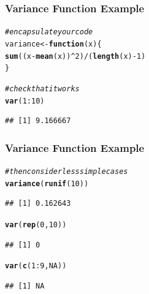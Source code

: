 \documentclass[12pt]{beamer}\usepackage[]{graphicx}\usepackage[]{color}
\makeatletter
\newcommand{\hlnum}[1]{\textcolor[rgb]{0.686,0.059,0.569}{#1}}%
\newcommand{\hlcom}[1]{\textcolor[rgb]{0.678,0.584,0.686}{\textit{#1}}}%
\newcommand{\hlopt}[1]{\textcolor[rgb]{0,0,0}{#1}}%
\newcommand{\hlstd}[1]{\textcolor[rgb]{0.345,0.345,0.345}{#1}}%
\newcommand{\hlkwa}[1]{\textcolor[rgb]{0.161,0.373,0.58}{\textbf{#1}}}%
\newcommand{\hlkwb}[1]{\textcolor[rgb]{0.69,0.353,0.396}{#1}}%
\newcommand{\hlkwc}[1]{\textcolor[rgb]{0.333,0.667,0.333}{#1}}%
\newcommand{\hlkwd}[1]{\textcolor[rgb]{0.737,0.353,0.396}{\textbf{#1}}}%
\newenvironment{kframe}{%
 \def\at@end@of@kframe{}%
 \ifinner\ifhmode%
  \def\at@end@of@kframe{\end{minipage}}%
  \begin{minipage}{\columnwidth}%
 \fi\fi%
 \def\FrameCommand##1{\hskip\@totalleftmargin \hskip-\fboxsep
 \colorbox{shadecolor}{##1}\hskip-\fboxsep
     \hskip-\linewidth \hskip-\@totalleftmargin \hskip\columnwidth}%
 \MakeFramed {\advance\hsize-\width
   \@totalleftmargin\z@ \linewidth\hsize
   \@setminipage}}%
 {\par\unskip\endMakeFramed%
 \at@end@of@kframe}
\newenvironment{knitrout}{}{} %
\makeatother
\begin{document}

\begin{frame}[fragile]
\frametitle{Variance Function Example}

\begin{knitrout}\footnotesize
{}\color{fgcolor}\begin{kframe}
\begin{alltt}
\hlcom{# encapsulate your code}
\hlstd{variance} \hlkwb{<-} \hlkwa{function}\hlstd{(}\hlkwc{x}\hlstd{) \{}
  \hlkwd{sum}\hlstd{((x} \hlopt{-} \hlkwd{mean}\hlstd{(x))}\hlopt{^}\hlnum{2}\hlstd{)} \hlopt{/} \hlstd{(}\hlkwd{length}\hlstd{(x)} \hlopt{-} \hlnum{1}\hlstd{)}
\hlstd{\}}

\hlcom{# check that it works}
\hlkwd{var}\hlstd{(}\hlnum{1}\hlopt{:}\hlnum{10}\hlstd{)}
\end{alltt}
\begin{verbatim}
## [1] 9.166667
\end{verbatim}
\end{kframe}
\end{knitrout}

\end{frame}


\begin{frame}[fragile]
\frametitle{Variance Function Example}

\begin{knitrout}\footnotesize
{}\color{fgcolor}\begin{kframe}
\begin{alltt}
\hlcom{# then consider less simple cases}
\hlkwd{variance} \hlstd{(}\hlkwd{runif}\hlstd{(}\hlnum{10}\hlstd{))}
\end{alltt}
\begin{verbatim}
## [1] 0.162643
\end{verbatim}
\begin{alltt}
\hlkwd{var}\hlstd{(}\hlkwd{rep}\hlstd{(}\hlnum{0}\hlstd{,} \hlnum{10}\hlstd{))}
\end{alltt}
\begin{verbatim}
## [1] 0
\end{verbatim}
\begin{alltt}
\hlkwd{var}\hlstd{(}\hlkwd{c}\hlstd{(}\hlnum{1}\hlopt{:}\hlnum{9}\hlstd{,} \hlnum{NA}\hlstd{))}
\end{alltt}
\begin{verbatim}
## [1] NA
\end{verbatim}
\end{kframe}
\end{knitrout}

\end{frame}
\end{document}
